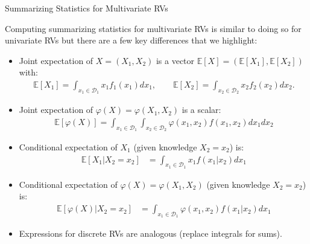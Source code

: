 \documentclass[9pt]{beamer}
\begin{document}
%
\begin{frame}{Summarizing Statistics for Multivariate RVs}

Computing summarizing statistics for multivariate RVs is similar to doing so for univariate RVs but there are a few key differences that we highlight:
\begin{itemize}
\setlength{\itemsep}{10pt}
\item Joint expectation of $X=(X_1,X_2)$ is a vector $\mathbb{E}[X]=(\mathbb{E}[X_1],\mathbb{E}[X_2])$ with:
\begin{align*}
\mathbb{E}[X_1]=\int_{x_1\in \mathcal{D}_1}x_1f_1(x_1)dx_1,\qquad \mathbb{E}[X_2]=\int_{x_2\in \mathcal{D}_2}x_2f_2(x_2)dx_2.
\end{align*}
\item Joint expectation of $\varphi(X)=\varphi(X_1,X_2)$ is a scalar:
 \begin{align*}
\mathbb{E}[\varphi(X)]=\int_{x_1\in \mathcal{D}_1}\int_{x_2\in\mathcal{D}_2}\varphi(x_1,x_2)f(x_1,x_2)dx_1dx_2
\end{align*}
\item Conditional expectation of $X_1$ (given knowledge $X_2=x_2$) is:
 \begin{align*}
\mathbb{E}[X_1|X_2=x_2]&=\int_{x_1\in \mathcal{D}_1}x_1f(x_1|x_2)dx_1
\end{align*}
\item Conditional expectation of $\varphi(X)=\varphi(X_1,X_2)$ (given knowledge $X_2=x_2$) is:
 \begin{align*}
\mathbb{E}[\varphi(X)|X_2=x_2]&=\int_{x_1\in \mathcal{D}_1}\varphi(x_1,x_2)f(x_1|x_2)dx_1
\end{align*}
\item Expressions for discrete RVs are analogous (replace integrals for sums). 

\end{itemize}

\end{frame}
\end{document}
